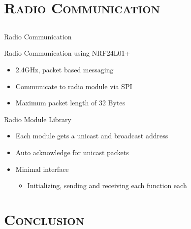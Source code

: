 	\section{\scshape Radio Communication}
	\subsection{}
   \begin{frame}
      \Huge{\centerline{Radio Communication}}
   \end{frame}

	\begin{frame}{Radio Communication using NRF24L01+}
		\begin{itemize}
			\item 2.4GHz, packet based messaging
			\item Communicate to radio module via SPI
			\item Maximum packet length of 32 Bytes
		\end{itemize}
	\end{frame}
	
	\begin{frame}{Radio Module Library}
		\begin{itemize}
			\item Each module gets a unicast and broadcast address
			\item Auto acknowledge for unicast packets
			\item Minimal interface
			\begin{itemize}
				\item Initializing, sending and receiving each function each
			\end{itemize}
		\end{itemize}
	\end{frame}
	
	
	\section{\scshape Conclusion}
